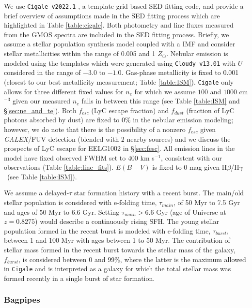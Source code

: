 \documentclass[twocolumn,tight,times,linenumbers]{aastex631}
\newcommand{\hbeta}{H$\beta$}
\newcommand{\hgamma}{H$\gamma$}
\begin{document}
		We use \texttt{Cigale v2022.1} \citep{Boquien2019,Yang2022}, a template grid-based SED fitting code, and provide a brief overview of assumptions made in the SED fitting process which are highlighted in Table \ref{table:cigale}. Both photometry and line fluxes measured from the GMOS spectra are included in the SED fitting process. Briefly, we assume a \cite{Bruzual2003} stellar population synthesis model coupled with a \cite{Chabrier2003} IMF and consider stellar metallicities within the range of 0.005 and 1 $Z_\odot$. Nebular emission is modeled using the \cite{Inoue2011} templates which were generated using \texttt{Cloudy v13.01} \citep{Ferland2013} with $U$ considered in the range of $-3.0$ to $-1.0$. Gas-phase metallicity is fixed to 0.001 (closest to our best metallicity measurement; Table \ref{table:ISM}). \texttt{Cigale} only allows for three different fixed values for $n_e$ for which we assume $100$ and $1000$ cm$^{-3}$ given our measured $n_e$ falls in between this range (see Table \ref{table:ISM} and \S\ref{sec:ne_and_te}). Both $f_{esc} $ (LyC escape fraction) and $f_{dust}$ (fraction of LyC photons absorbed by dust) are fixed to $0$\% in the nebular emission modeling; however, we do note that there is the possibility of a nonzero $f_{esc}$ given \textit{GALEX}/FUV detection (blended with 2 nearby sources) and we discuss the prospects of LyC escape for EELG1002 in \S\ref{sec:fesc}. All emission lines in the model have fixed observed FWHM set to $400$ km s$^{-1}$, consistent with our observations (Table \ref{table:line_fits}). $E(B-V)$ is fixed to 0 mag given \hbeta/\hgamma~(see Table \ref{table:ISM}).

		We assume a delayed-$\tau$ star formation history with a recent burst. The main/old stellar population is considered with e-folding time, $\tau_{main}$, of 50 Myr to 7.5 Gyr and ages of 50 Myr to 6.6 Gyr. Setting $\tau_{main} > 6.6$ Gyr (age of Universe at $z = 0.8275$) would describe a continuously rising SFH. The young stellar population formed in the recent burst is modeled with e-folding time, $\tau_{burst}$, between 1 and 100 Myr with ages between 1 to 50 Myr. The contribution of stellar mass formed in the recent burst towards the stellar mass of the galaxy, $f_{burst}$, is considered between 0 and 99\%, where the latter is the maximum allowed in \texttt{Cigale} and is interpreted as a galaxy for which the total stellar mass was formed recently in a single burst of star formation.

		\subsubsection{Bagpipes}
		\label{sec:bagpipes}
		
\end{document}
